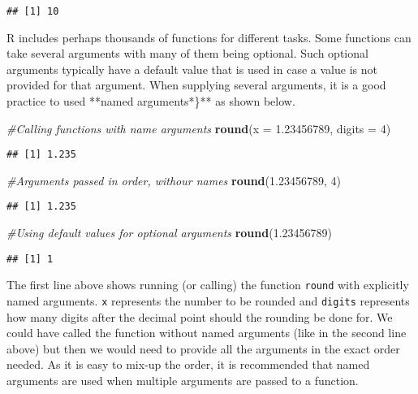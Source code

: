 \documentclass[
]{krantz}
\makeatletter
\newenvironment{Shaded}{\begin{snugshade}}{\end{snugshade}}
\newcommand{\CommentTok}[1]{\textcolor[rgb]{0.37,0.37,0.37}{\textit{#1}}}
\newcommand{\DataTypeTok}[1]{\textcolor[rgb]{0.27,0.27,0.27}{#1}}
\newcommand{\DecValTok}[1]{\textcolor[rgb]{0.06,0.06,0.06}{#1}}
\newcommand{\FloatTok}[1]{\textcolor[rgb]{0.06,0.06,0.06}{#1}}
\newcommand{\KeywordTok}[1]{\textcolor[rgb]{0.27,0.27,0.27}{\textbf{#1}}}
\newcommand{\NormalTok}[1]{#1}
\newenvironment{kframe}{%
\medskip{}
\setlength{\fboxsep}{.8em}
 \def\at@end@of@kframe{}%
 \ifinner\ifhmode%
  \def\at@end@of@kframe{\end{minipage}}%
  \begin{minipage}{\columnwidth}%
 \fi\fi%
 \def\FrameCommand##1{\hskip\@totalleftmargin \hskip-\fboxsep
 \colorbox{shadecolor}{##1}\hskip-\fboxsep
     \hskip-\linewidth \hskip-\@totalleftmargin \hskip\columnwidth}%
 \MakeFramed {\advance\hsize-\width
   \@totalleftmargin\z@ \linewidth\hsize
   \@setminipage}}%
 {\par\unskip\endMakeFramed%
 \at@end@of@kframe}
\renewenvironment{Shaded}{\begin{kframe}}{\end{kframe}}
\makeatother
\begin{document}
\begin{verbatim}
## [1] 10
\end{verbatim}

R includes perhaps thousands of functions for different tasks. Some functions can take several arguments with many of them being optional. Such optional arguments typically have a default value that is used in case a value is not provided for that argument. When supplying several arguments, it is a good practice to used **named arguments*\}** as shown below.

\begin{Shaded}
\begin{Highlighting}[]
\CommentTok{#Calling functions with name arguments}
\KeywordTok{round}\NormalTok{(}\DataTypeTok{x =} \FloatTok{1.23456789}\NormalTok{, }\DataTypeTok{digits =} \DecValTok{4}\NormalTok{) }
\end{Highlighting}
\end{Shaded}

\begin{verbatim}
## [1] 1.235
\end{verbatim}

\begin{Shaded}
\begin{Highlighting}[]
\CommentTok{#Arguments passed in order, withour names}
\KeywordTok{round}\NormalTok{(}\FloatTok{1.23456789}\NormalTok{, }\DecValTok{4}\NormalTok{)}
\end{Highlighting}
\end{Shaded}

\begin{verbatim}
## [1] 1.235
\end{verbatim}

\begin{Shaded}
\begin{Highlighting}[]
\CommentTok{#Using default values for optional arguments}
\KeywordTok{round}\NormalTok{(}\FloatTok{1.23456789}\NormalTok{) }
\end{Highlighting}
\end{Shaded}

\begin{verbatim}
## [1] 1
\end{verbatim}

The first line above shows running (or calling) the function \texttt{round} with explicitly named arguments. \texttt{x} represents the number to be rounded and \texttt{digits} represents how many digits after the decimal point should the rounding be done for. We could have called the function without named arguments (like in the second line above) but then we would need to provide all the arguments in the exact order needed. As it is easy to mix-up the order, it is recommended that named arguments are used when multiple arguments are passed to a function.
\end{document}

